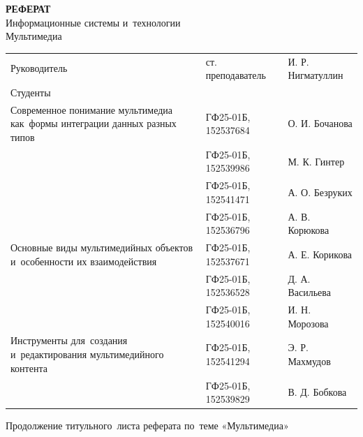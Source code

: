 \documentclass{ou}
\begin{document}
\thispagestyle{empty}
\begin{center}
\shortstack{\FGAVO}\vspace{4\baselineskip}
\textbf{РЕФЕРАТ}\\
Информационные системы и~технологии\\
Мультимедиа\vspace{2\baselineskip}\end{center}
\begin{flushleft}
\doublespacing
\begin{tabularx}{\textwidth}{@{} p{} l l @{}}
Руководитель & ст. преподаватель & И. Р. Нигматуллин\\
Студенты     &                   &                  \\
\multirow{-2.27}{\hsize}{\singlespacing Современное понимание мультимедиа как~формы интеграции данных разных типов}
             & ГФ25-01Б, 152537684 & О. И. Бочанова\\
             & ГФ25-01Б, 152539986 & М. К. Гинтер\\
             & ГФ25-01Б, 152541471 & А. О. Безруких\\
             & ГФ25-01Б, 152536796 & А. В. Корюкова\\
\multirow{-2.27}{\hsize}{\singlespacing Основные виды мультимедийных объектов и~особенности их взаимодействия}
             & ГФ25-01Б, 152537671 & А. Е. Корикова\\
             & ГФ25-01Б, 152536528 & Д. А. Васильева\\
             & ГФ25-01Б, 152540016 & И. Н. Морозова\\
\multirow{-2.27}{\hsize}{\singlespacing Инструменты для~создания и~редактирования мультимедийного контента}
             & ГФ25-01Б, 152541294 & Э. Р. Махмудов\\
             & ГФ25-01Б, 152539829 & В. Д. Бобкова\\
\end{tabularx}
\end{flushleft}
\vspace*{\fill}
\begin{center}
\city
\end{center}
\newpage
\thispagestyle{empty}
Продолжение титульного~листа реферата по~теме «Мультимедиа»
\end{document}
